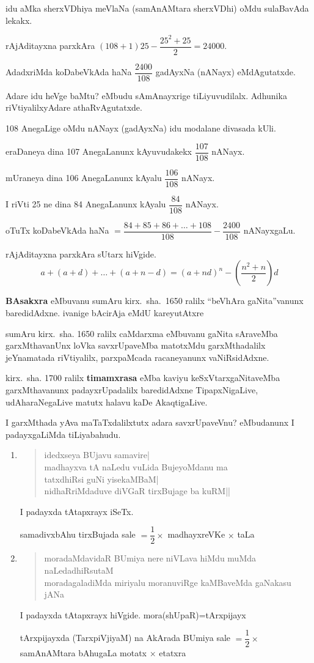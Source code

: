 idu aMka sherxVDhiya meVlaNa (samAnAMtara sherxVDhi) oMdu sulaBavAda lekakx.

rAjAditayxna parxkAra $(108+1)25-\dfrac{25^2+25}{2}=24000$.

AdadxriMda koDabeVkAda haNa $\dfrac{2400}{108}$ gadAyxNa (nANayx) eMdAgutatxde.

Adare idu heVge baMtu? eMbudu sAmAnayxrige tiLiyuvudilalx. Adhunika riVtiyalilxyAdare athaRvAgutatxde.

{\rm 108} AnegaLige oMdu nANayx (gadAyxNa) idu modalane divasada kUli.

eraDaneya dina {\rm 107} AnegaLanunx kAyuvudakekx $\dfrac{107}{108}$ nANayx.

mUraneya dina {\rm 106} AnegaLanunx kAyalu $\dfrac{106}{108}$ nANayx.

I riVti {\rm 25} ne dina {\rm 84} AnegaLanunx kAyalu $\dfrac{84}{108}$ nANayx.

oTuTx koDabeVkAda haNa $=\dfrac{84+85+86+\ldots+108}{108}-\dfrac{2400}{108}$ nANayxgaLu.

rAjAditayxna parxkAra sUtarx hiVgide.
$$
a+(a+d)+\ldots+(a+n-d)
=(a+nd)^n-(\dfrac{n^2+n}{2})d
$$

\textbf{BAsakxra} eMbuvanu sumAru kirx.~sha.~{\rm 1650} ralilx ``beVhAra gaNita''vanunx baredi\-dAdxne. ivanige bAcirAja eMdU kareyutAtxre 

sumAru kirx.~sha. {\rm 1650} ralilx caMdarxma eMbuvanu gaNita sAraveMba garxMthavanUnx loVka savxrUpaveMba matotxMdu garxMthadalilx jeYnamatada riVtiyalilx, parxpaMcada racaneyanunx vaNiRsidAdxne.

kirx.~sha. {\rm 1700} ralilx \textbf{timamxrasa} eMba kaviyu keSxVtarxgaNitaveMba garxMthavanunx padayxrUpa\-dalilx baredidAdxne TipapxNigaLive, udAharaNegaLive matutx halavu kaDe AkaqtigaLive.

I garxMthada yAva maTaTxdalilxtutx adara savxrUpaveVnu? eMbudanunx I padayxgaLiMda tiLiyabahudu.
\begin{enumerate}[\rm 1)]
\item 
\begin{verse}
idedxseya BUjavu samavire|\\
madhayxva tA naLedu vuLida BujeyoMdanu ma\\
tatxdhiRsi guNi yisekaMBaM|\\
nidhaRriMdaduve diVGaR tirxBujage ba kuRM||
\end{verse}
I padayxda tAtapxrayx iSeTx. 

samadivxbAhu tirxBujada sale $=\dfrac{1}{2}\times$ madhayxreVKe $\times$ taLa

\item 
\begin{verse}
moradaMdavidaR BUmiya nere niVLava hiMdu muMda naLe\-dadhiRsutaM\\
moradagaladiMda miriyalu moranuviRge kaMBaveMda gaNakasu jANa
\end{verse}

I padayxda tAtapxrayx hiVgide. \qquad mora(shUpaR)=tArxpijayx

tArxpijayxda (TarxpiVjiyaM) na AkArada BUmiya sale $=\dfrac{1}{2}\times$ samAnAMtara bAhugaLa motatx $\times$ etatxra
\end{enumerate}

